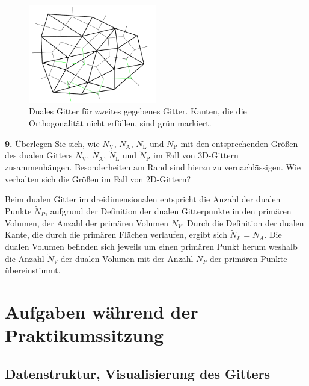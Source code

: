 \documentclass[Protokollheft.tex]{subfiles}
\begin{document}
\begin{figure}[h]
	\centering
	\includegraphics[width=0.5\textwidth]{Duales_Gitter_2.png}
	\caption{Duales Gitter für zweites gegebenes Gitter. Kanten, die die Orthogonalität nicht erfüllen, sind grün markiert.}
	\label{Abb:dual_2}
\end{figure}

        \begin{framed}
	\noindent \textbf{9.}
        Überlegen Sie sich, wie $N_\text{V}$, $N_\text{A}$, $N_\text{L}$ und $N_\text{P}$
        mit den entsprechenden Größen des dualen Gitters $\widetilde N_\text{V}$,
        $\widetilde N_\text{A}$, $\widetilde N_\text{L}$ und $\widetilde N_\text{P}$ im Fall
        von 3D-Gittern zusammenhängen. Besonderheiten am Rand sind hierzu zu vernachlässigen.
        Wie verhalten sich die Größen im Fall von 2D-Gittern?\label{exer:primaryDualCorrespondence}
\end{framed}
\noindent
Beim dualen Gitter im dreidimensionalen entspricht die Anzahl der dualen Punkte $\tilde{N}_P$, aufgrund der Definition der dualen Gitterpunkte in den primären Volumen, der Anzahl der primären Volumen ${N_V}$. Durch die Definition der dualen Kante, die durch die primären Flächen verlaufen, ergibt sich $\tilde{N}_L = N_A$. Die dualen Volumen befinden sich jeweils um einen primären Punkt herum weshalb die Anzahl $\tilde{N}_V$ der dualen Volumen mit der Anzahl $N_P$ der primären Punkte übereinstimmt.  
\section{Aufgaben während der Praktikumssitzung}

    {\subsection{Datenstruktur, Visualisierung des Gitters}}
\end{document}
